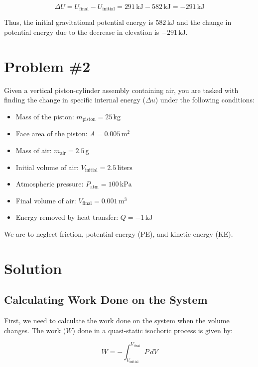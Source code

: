 \documentclass[12pt]{article}
\begin{document}
\[
\Delta U = U_{\text{final}} - U_{\text{initial}} = 291 \, \text{kJ} - 582 \, \text{kJ} = -291 \, \text{kJ}
\]

Thus, the initial gravitational potential energy is \(582 \, \text{kJ}\) and the change in potential energy due to the decrease in elevation is \(-291 \, \text{kJ}\).


\newpage
\section*{Problem \#2}

Given a vertical piston-cylinder assembly containing air, you are tasked with finding the change in specific internal energy (\( \Delta u \)) under the following conditions:

\begin{itemize}
    \item Mass of the piston: \( m_{\text{piston}} = 25 \, \text{kg} \)
    \item Face area of the piston: \( A = 0.005 \, \text{m}^2 \)
    \item Mass of air: \( m_{\text{air}} = 2.5 \, \text{g} \)
    \item Initial volume of air: \( V_{\text{initial}} = 2.5 \, \text{liters} \)
    \item Atmospheric pressure: \( P_{\text{atm}} = 100 \, \text{kPa} \)
    \item Final volume of air: \( V_{\text{final}} = 0.001 \, \text{m}^3 \)
    \item Energy removed by heat transfer: \( Q = -1 \, \text{kJ} \)
\end{itemize}

We are to neglect friction, potential energy (PE), and kinetic energy (KE).

\section*{Solution}

\subsection*{Calculating Work Done on the System}

First, we need to calculate the work done on the system when the volume changes. The work (\( W \)) done in a quasi-static isochoric process is given by:

\[
W = - \int_{V_{\text{initial}}}^{V_{\text{final}}} P \, dV
\]
\end{document}
